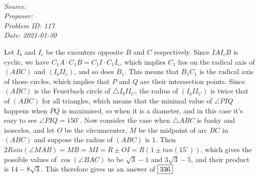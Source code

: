 \SSbreak\\
\emph{Source: \Cop}\\
\emph{Proposer: \Pmatt}\\
\emph{Problem ID: 117}\\
\emph{Date: 2021-01-30}\\
\SSbreak

\bigskip

\begin{solution}\hfil\medskip

Let $I_b$ and $I_c$ be the excenters opposite $B$ and $C$ respectively. Since $IAI_cB$ is cyclic, we have $C_1A \cdot C_1B=C_1I \cdot C_1I_c$, which implies $C_1$ lies on the radical axis of $(ABC)$ and $(I_bII_c)$, and so does $B_1$. This means that $B_1C_1$ is the radical axis of those circles, which implies that $P$ and $Q$ are their intersection points. Since $(ABC)$ is the Feuerbach circle of $\triangle I_bII_C$, the radius of $(I_bII_C)$ is twice that of $(ABC)$ for all triangles, which means that the minimal value of $\angle PIQ$ happens when $PQ$ is maximised, so when it is a diameter, and in this case it's easy to see $\angle PIQ=150^{\circ}$. Now consider the case when $\triangle ABC$ is funky and isosceles, and let $O$ be the circumcenter, $M$ be the midpoint of arc $BC$ in $(ABC)$ and suppose the radius of $(ABC)$ is $1$. Then $2Rsin(\angle MAB)=MB=MI=R\pm OI=R(1\pm tan(15^{\circ}))$, which gives the possible values of $\cos\left(\angle BAC\right)$ to be $\sqrt{3}-1$ and $3\sqrt{3}-5$, and their product is $14-8\sqrt{3}$. This therefore gives us an answer of \(\fbox{336}\)
\end{solution}\bigskip
